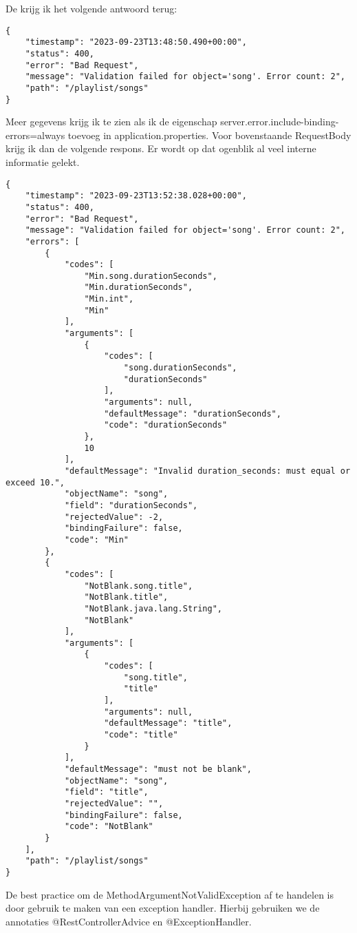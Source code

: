 De krijg ik het volgende antwoord terug:

\begin{verbatim}
{
	"timestamp": "2023-09-23T13:48:50.490+00:00",
	"status": 400,
	"error": "Bad Request",
	"message": "Validation failed for object='song'. Error count: 2",
	"path": "/playlist/songs"
}
\end{verbatim}

Meer gegevens krijg ik te zien als ik de eigenschap server.error.include-binding-errors=always toevoeg in application.properties. Voor bovenstaande RequestBody krijg ik dan de volgende respons. Er wordt op dat ogenblik al veel interne informatie gelekt.

\begin{verbatim}
{
	"timestamp": "2023-09-23T13:52:38.028+00:00",
	"status": 400,
	"error": "Bad Request",
	"message": "Validation failed for object='song'. Error count: 2",
	"errors": [
		{
			"codes": [
				"Min.song.durationSeconds",
				"Min.durationSeconds",
				"Min.int",
				"Min"
			],
			"arguments": [
				{
					"codes": [
						"song.durationSeconds",
						"durationSeconds"
					],
					"arguments": null,
					"defaultMessage": "durationSeconds",
					"code": "durationSeconds"
				},
				10
			],
			"defaultMessage": "Invalid duration_seconds: must equal or exceed 10.",
			"objectName": "song",
			"field": "durationSeconds",
			"rejectedValue": -2,
			"bindingFailure": false,
			"code": "Min"
		},
		{
			"codes": [
				"NotBlank.song.title",
				"NotBlank.title",
				"NotBlank.java.lang.String",
				"NotBlank"
			],
			"arguments": [
				{
					"codes": [
						"song.title",
						"title"
					],
					"arguments": null,
					"defaultMessage": "title",
					"code": "title"
				}
			],
			"defaultMessage": "must not be blank",
			"objectName": "song",
			"field": "title",
			"rejectedValue": "",
			"bindingFailure": false,
			"code": "NotBlank"
		}
	],
	"path": "/playlist/songs"
}
\end{verbatim}

De best practice om de MethodArgumentNotValidException af te handelen is door gebruik te maken van een exception handler.  Hierbij gebruiken we de annotaties @RestControllerAdvice en @ExceptionHandler. 

